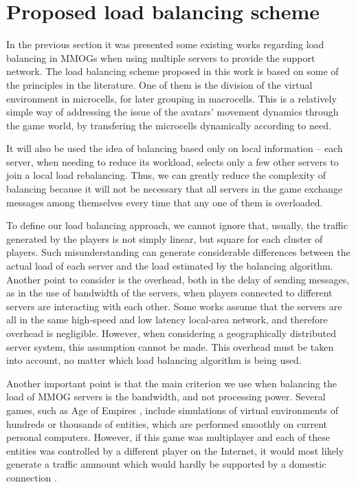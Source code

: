 \section{Proposed load balancing scheme}
\label{sec:scheme}

In the previous section it was presented some existing works regarding load balancing in MMOGs when using multiple servers to provide the support network. The load balancing scheme proposed in this work is based on some of the principles in the literature. One of them is the division of the virtual environment in microcells, for later grouping in macrocells. This is a relatively simple way of addressing the issue of the avatars' movement dynamics through the game world, by transfering the microcells dynamically according to need.

It will also be used the idea of balancing based only on local information -- each server, when needing to reduce its workload, selects only a few other servers to join a local load rebalancing. Thus, we can greatly reduce the complexity of balancing because it will not be necessary that all servers in the game exchange messages among themselves every time that any one of them is overloaded.

To define our load balancing approach, we cannot ignore that, usually, the traffic generated by the players is not simply linear, but square for each cluster of players. Such misunderstanding can generate considerable differences between the actual load of each server and the load estimated by the balancing algorithm. Another point to consider is the overhead, both in the delay of sending messages, as in the use of bandwidth of the servers, when players connected to different servers are interacting with each other. Some works assume that the servers are all in the same high-speed and low latency local-area network, and therefore overhead is negligible. However, when considering a geographically distributed server system, this assumption cannot be made. This overhead must be taken into account, no matter which load balancing algorithm is being used.

Another important point is that the main criterion we use when balancing the load of MMOG servers is the bandwidth, and not processing power. Several games, such as Age of Empires \cite{ageofempires}, include simulations of virtual environments of hundreds or thousands of entities, which are performed smoothly on current personal computers. However, if this game was multiplayer and each of these entities was controlled by a different player on the Internet, it would most likely generate a traffic ammount which would hardly be supported by a domestic connection \cite{feng2007wnn}.

